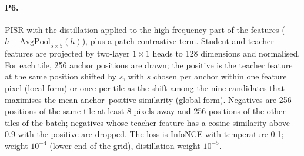 \documentclass[pdflatex,sn-basic,referee,lineno]{sn-jnl}
\begin{document}
\begin{appendices}
\paragraph{P6.} PISR with the distillation applied to the high-frequency part of the features
($h - \mathrm{AvgPool}_{5\times5}(h)$), plus a patch-contrastive term. Student and teacher features are projected by
two-layer $1\times1$ heads to 128 dimensions and normalised. For each tile, 256 anchor positions are drawn; the
positive is the teacher feature at the same position shifted by $s$, with $s$ chosen per anchor within one feature
pixel (local form) or once per tile as the shift among the nine candidates that maximises the mean anchor--positive
similarity (global form). Negatives are 256 positions of the same tile at least 8 pixels away and 256 positions of
the other tiles of the batch; negatives whose teacher feature has a cosine similarity above 0.9 with the positive
are dropped. The loss is InfoNCE with temperature 0.1; weight $10^{-4}$ (lower end of the grid), distillation weight
$10^{-5}$.

\end{appendices}


\end{document}
